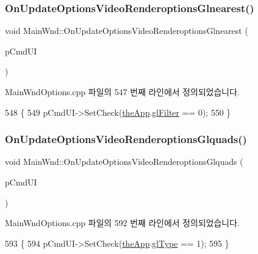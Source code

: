 \subsubsection{\texorpdfstring{On\+Update\+Options\+Video\+Renderoptions\+Glnearest()}{OnUpdateOptionsVideoRenderoptionsGlnearest()}}
{\footnotesize\ttfamily void Main\+Wnd\+::\+On\+Update\+Options\+Video\+Renderoptions\+Glnearest (\begin{DoxyParamCaption}\item[{C\+Cmd\+UI $\ast$}]{p\+Cmd\+UI }\end{DoxyParamCaption})\hspace{0.3cm}{\ttfamily [protected]}}



Main\+Wnd\+Options.\+cpp 파일의 547 번째 라인에서 정의되었습니다.


\begin{DoxyCode}
548 \{
549   pCmdUI->SetCheck(\mbox{\hyperlink{_v_b_a_8cpp_a8095a9d06b37a7efe3723f3218ad8fb3}{theApp}}.\mbox{\hyperlink{class_v_b_a_a7861cd60864163f310ae87f746eba9e6}{glFilter}} == 0);
550 \}
\end{DoxyCode}
\mbox{\label{class_main_wnd_a4914ee86ae355c18c88b733db04529bb}} 
\subsubsection{\texorpdfstring{On\+Update\+Options\+Video\+Renderoptions\+Glquads()}{OnUpdateOptionsVideoRenderoptionsGlquads()}}
{\footnotesize\ttfamily void Main\+Wnd\+::\+On\+Update\+Options\+Video\+Renderoptions\+Glquads (\begin{DoxyParamCaption}\item[{C\+Cmd\+UI $\ast$}]{p\+Cmd\+UI }\end{DoxyParamCaption})\hspace{0.3cm}{\ttfamily [protected]}}



Main\+Wnd\+Options.\+cpp 파일의 592 번째 라인에서 정의되었습니다.


\begin{DoxyCode}
593 \{
594   pCmdUI->SetCheck(\mbox{\hyperlink{_v_b_a_8cpp_a8095a9d06b37a7efe3723f3218ad8fb3}{theApp}}.\mbox{\hyperlink{class_v_b_a_afb5faab6c2ddf2661b2fe19f118fd882}{glType}} == 1);
595 \}
\end{DoxyCode}
\mbox{\label{class_main_wnd_ac7ba8a582332e116ac1619d9fcbdafc8}} 
